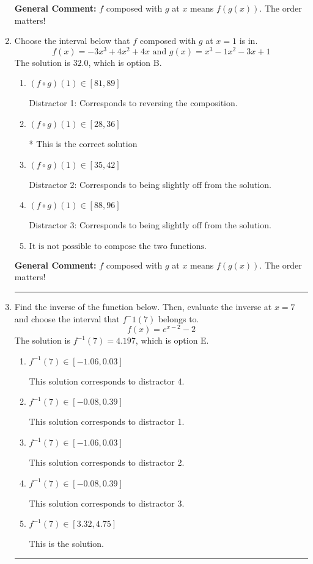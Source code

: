 \documentclass{extbook}[14pt]
\newcommand{\litem}[1]{\item #1

\rule{\textwidth}{0.4pt}}
\begin{document}
\begin{enumerate}
{\begin{enumerate}[label=\Alph*.]
\end{enumerate}

\textbf{General Comment:} $f$ composed with $g$ at $x$ means $f(g(x))$. The order matters!
}
\litem{
Choose the interval below that $f$ composed with $g$ at $x=1$ is in.
\[ f(x) = -3x^{3} +4 x^{2} +4 x \text{ and } g(x) = x^{3} -1 x^{2} -3 x + 1 \]The solution is \( 32.0 \), which is option B.\begin{enumerate}[label=\Alph*.]
\item \( (f \circ g)(1) \in [81, 89] \)

 Distractor 1: Corresponds to reversing the composition.
\item \( (f \circ g)(1) \in [28, 36] \)

* This is the correct solution
\item \( (f \circ g)(1) \in [35, 42] \)

 Distractor 2: Corresponds to being slightly off from the solution.
\item \( (f \circ g)(1) \in [88, 96] \)

 Distractor 3: Corresponds to being slightly off from the solution.
\item \( \text{It is not possible to compose the two functions.} \)


\end{enumerate}

\textbf{General Comment:} $f$ composed with $g$ at $x$ means $f(g(x))$. The order matters!
}
\litem{
Find the inverse of the function below. Then, evaluate the inverse at $x = 7$ and choose the interval that $f^-1(7)$ belongs to.
\[ f(x) = e^{x-2}-2 \]The solution is \( f^{-1}(7) = 4.197 \), which is option E.\begin{enumerate}[label=\Alph*.]
\item \( f^{-1}(7) \in [-1.06, 0.03] \)

 This solution corresponds to distractor 4.
\item \( f^{-1}(7) \in [-0.08, 0.39] \)

 This solution corresponds to distractor 1.
\item \( f^{-1}(7) \in [-1.06, 0.03] \)

 This solution corresponds to distractor 2.
\item \( f^{-1}(7) \in [-0.08, 0.39] \)

 This solution corresponds to distractor 3.
\item \( f^{-1}(7) \in [3.32, 4.75] \)

 This is the solution.
\end{enumerate}

}
\end{enumerate}
\end{document}
